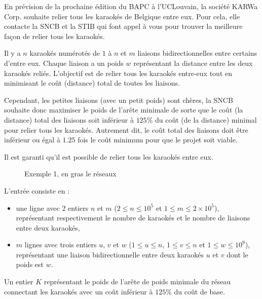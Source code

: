 \problemname{\problemyamlname}


En prévision de la prochaine édition du BAPC à l'UCLouvain, la société KARWa Corp. souhaite relier tous les karaokés de Belgique entre eux.
Pour cela, elle contacte la SNCB et la STIB qui font appel à vous pour trouver la meilleure façon de relier tous les karaokés.

Il y a $n$ karaokés numérotés de $1$ à $n$ et $m$ liaisons bidirectionnelles entre certains d'entre eux.
Chaque liaison a un poids $w$ représentant la distance entre les deux karaokés reliés.
L'objectif est de relier tous les karaokés entre-eux tout en minimisant le coût (distance) total de toutes les liaisons.

Cependant, les petites liaisons (avec un petit poids) sont chères, la SNCB souhaite donc maximiser le poids de l'arête minimale de sorte que le coût (la distance) total des liaisons soit inférieur à $125\%$ du coût (de la distance) minimal pour relier tous les karaokés.
Autrement dit, le coût total des liaisons doit être inférieur ou égal à $1.25$ fois le coût minimum pour que le projet soit viable.

Il est garanti qu'il est possible de relier tous les karaokés entre eux.

\begin{figure}[h]
	\centering
	  \caption[]{Exemple 1, en gras le réseaux}
\end{figure}

\begin{Input}
	L'entrée consiste en :
	\begin{itemize}
		\item une ligne avec 2 entiers $n$ et $m$ ($2 \le n \le 10^5$ et $1 \le m \le 2 \times 10^5$), représentant respectivement le nombre de karaokés et le nombre de liaisons entre deux karaokés,
		\item $m$ lignes avec trois entiers $u$, $v$ et $w$ ($1 \le u \le n$, $1 \le v \le n$ et $1 \le w \le 10^9$), représentant une liaison bidirectionnelle entre deux karaokés $u$ et $v$ dont le poids est $w$.
	\end{itemize}
\end{Input}

\begin{Output}
	Un entier $K$ représentant le poids de l'arête de poids minimale du réseau connectant les karaokés avec un coût inférieur à $125\%$ du coût de base.
\end{Output}
